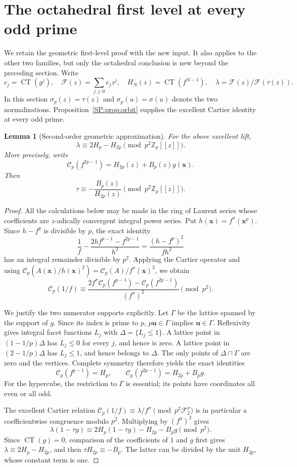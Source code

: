 \documentclass[11pt,a4paper]{article}
\newtheorem{lemma}[theorem]{Lemma}
\theoremstyle{definition}\newtheorem{definition}[theorem]{Definition}
\theoremstyle{remark}\newtheorem{remark}[theorem]{Remark}
\DeclareMathOperator{\CT}{CT}
\numberwithin{equation}{section}
\begin{document}
\section{The octahedral first level at every odd prime}\label{SP:source-main-4}
We retain the geometric first-level proof with the new input. It also
applies to the other two families, but only the octahedral conclusion is
new beyond the preceding section. Write
\[
c_j=\CT(g^j),\quad \mathcal F(z)=\sum_{j\ge0}c_jz^j,
\quad H_N(z)=\CT(f^{N-1}),\quad
\lambda=\mathcal F(z)/\mathcal F(\tau(z)).
\]
In this section $\sigma_p(z)=\tau(z)$ and $\sigma_p(u)=\sigma(u)$
denote the two normalizations. Proposition~\ref{SP:prop:orbit} supplies
the excellent Cartier identity at every odd prime.
\begin{lemma}[Second-order geometric approximation]
\label{SP:L:lem:second-geometric}
For the above excellent lift,
\[
 \lambda\equiv2H_p-H_{2p}\pmod{p^2\mathbb Z_p[[z]]}.
\]
More precisely, write
\[
 \mathscr C_p(f^{2p-1})=H_{2p}(z)+B_p(z)g(\mathbf{x}).
\]
Then
\[
 \tau\equiv-\frac{B_p(z)}{H_{2p}(z)}\pmod{p^2\mathbb Z_p[[z]]}.
\]
\end{lemma}

\begin{proof}
All the calculations below may be made in the ring of Laurent series
whose coefficients are \(z\)-adically convergent integral power series.
Put \(h(\mathbf{x})=f^\sigma(\mathbf{x}^p)\).  Since \(h-f^p\) is
divisible by \(p\), the exact identity
\[
 \frac1f-\frac{2hf^{p-1}-f^{2p-1}}{h^2}
 =\frac{(h-f^p)^2}{fh^2}
\]
has an integral remainder divisible by \(p^2\).  Applying the Cartier
operator and using
\(\mathscr C_p(A(\mathbf{x})/h(\mathbf{x})^2)
 =\mathscr C_p(A) / f^\sigma(\mathbf{x})^2\), we obtain
\[
 \mathscr C_p(1/f)
 \equiv
 \frac{2f^\sigma\mathscr C_p(f^{p-1})
              -\mathscr C_p(f^{2p-1})}{(f^\sigma)^2}
 \pmod{p^2}.
\]

We justify the two numerator supports explicitly.  Let \(\Gamma\)
be the lattice spanned by the support of \(g\).  Since its index is
prime to \(p\), \(p\mathbf{u}\in\Gamma\) implies
\(\mathbf{u}\in\Gamma\).  Reflexivity gives integral facet functions
\(L_j\) with \(\Delta=\{L_j\leq1\}\).  A lattice point in
\((1-1/p)\Delta\) has \(L_j\leq0\) for every \(j\), and hence is
zero.  A lattice point in \((2-1/p)\Delta\) has \(L_j\leq1\), and
hence belongs to \(\Delta\).  The only points of
\(\Delta\cap\Gamma\) are zero and the vertices.  Complete symmetry
therefore yields the exact identities
\[
 \mathscr C_p(f^{p-1})=H_p,
 \qquad
 \mathscr C_p(f^{2p-1})=H_{2p}+B_p g.
\]
For the hypercube, the restriction to \(\Gamma\) is essential; its
points have coordinates all even or all odd.

The excellent Cartier relation
\(\mathscr C_p(1/f)\equiv\lambda/f^\sigma
 \pmod{p^2\mathscr F_2^\sigma}\)
is in particular a coefficientwise congruence modulo \(p^2\).
Multiplying by \((f^\sigma)^2\) gives
\[
 \lambda(1-\tau g)
 \equiv 2H_p(1-\tau g)-H_{2p}-B_p g\pmod{p^2}.
\]
Since \(\operatorname{CT}(g)=0\), comparison of the coefficients of
\(1\) and \(g\) first gives
\(\lambda\equiv2H_p-H_{2p}\), and then
\(\tau H_{2p}\equiv-B_p\).
The latter can be divided by the unit \(H_{2p}\), whose constant
term is one.
\end{proof}
\end{document}
